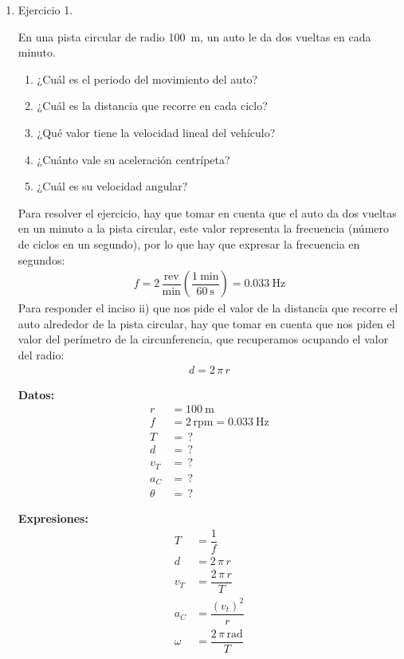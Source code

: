 \documentclass[14pt]{extarticle}
\begin{document}
\begin{enumerate}
\item Ejercicio 1.

En una pista circular de radio \SI{100}{\meter}, un auto le da dos vueltas en cada minuto.
\begin{enumerate}[label=\roman*)]
\item ¿Cuál es el periodo del movimiento del auto?
\item ¿Cuál es la distancia que recorre en cada ciclo?
\item ¿Qué valor tiene la velocidad lineal del vehículo?
\item ¿Cuánto vale su aceleración centrípeta?
\item ¿Cuál es su velocidad angular?
\end{enumerate}

Para resolver el ejercicio, hay que tomar en cuenta que el auto da dos vueltas en un minuto a la pista circular, este valor representa la frecuencia (número de ciclos en un segundo), por lo que hay que expresar la frecuencia en segundos:
\begin{align*}
f = 2 \, \dfrac{\text{rev}}{\unit{\minute}} \left( \dfrac{\SI{1}{\minute}}{\SI{60}{\second}} \right) = \SI{0.033}{\hertz}
\end{align*}
Para responder el inciso ii) que nos pide el valor de la distancia que recorre el auto alrededor de la pista circular, hay que tomar en cuenta que nos piden el valor del perímetro de la circunferencia, que recuperamos ocupando el valor del radio:
\begin{align*}
d = 2 \, \pi \, r
\end{align*}
\vspace*{0.5cm}
\begin{minipage}[t]{0.4\linewidth}
\textbf{Datos:}
\begin{align*}
r &= \SI{100}{\meter} \\
f &= 2 \, \text{rpm} = \SI{0.033}{\hertz} \\
T &= \, ? \\
d &= \, ? \\
v_{T} &= \, ? \\
a_{C} &= \, ? \\
\theta &= \, ?
\end{align*}
\end{minipage}
\begin{minipage}[t]{0.4\linewidth}
\textbf{Expresiones:}
\begin{align*}
T &= \dfrac{1}{f} \\
d &= 2 \, \pi \,  r \\
v_{T} &= \dfrac{2 \, \pi \, r }{T} \\
a_{C} &= \dfrac{(v_{t})^{2}}{r} \\
\omega &= \dfrac{2 \, \pi \, \unit{\radian}}{T}
\end{align*}
\end{minipage}


\end{enumerate}
\end{document}
